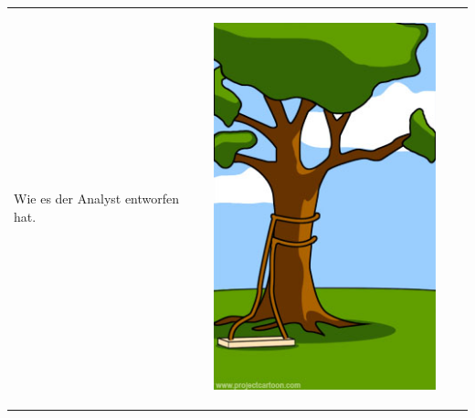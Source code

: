 \begin{tabularx}{\textwidth}{XXXX}
\begin{minipage}[t]{0.23\textwidth}
\begin{center}
Wie es der Analyst entworfen hat.
\end{center}
\end{minipage}
& 
\begin{minipage}[t]{0.23\textwidth}
\begin{center}
\includegraphics[width=1.0\textwidth]{./inf/SEKII/29_Softwaretechnik/PM_04.jpg}


\end{center}
\end{minipage}
\end{tabularx}
